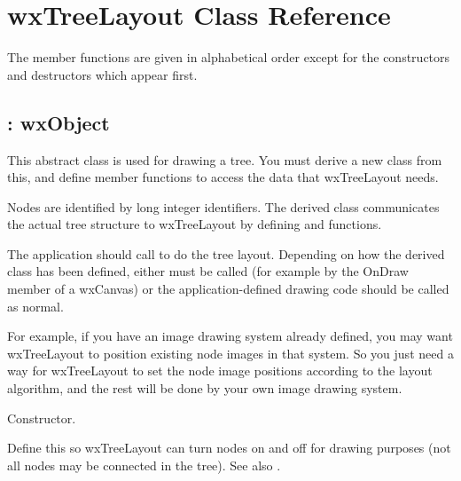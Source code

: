 \chapter{wxTreeLayout Class Reference}
%
\setfooter{\thepage}{}{}{}{}{\thepage}

The member functions are given in alphabetical order except for the
constructors and destructors which appear first.

\section{: wxObject}

This abstract class is used for drawing a tree. You must derive a new
class from this, and define member functions to access the data that
wxTreeLayout needs.

Nodes are identified by long integer identifiers. The derived class
communicates the actual tree structure to wxTreeLayout by defining \rtfsp
and  functions.

The application should call  to do the tree
layout. Depending on how the derived class has been defined, either
\rtfsp{} must be called (for example by the OnDraw member
of a wxCanvas) or the application-defined drawing code should be called
as normal.

For example, if you have an image drawing system already defined, you
may want wxTreeLayout to position existing node images in that system. So you
just need a way for wxTreeLayout to set the node image positions according to
the layout algorithm, and the rest will be done by your own image drawing
system.



Constructor.

\label{activatenode}


Define this so wxTreeLayout can turn nodes on and off for drawing purposes
(not all nodes may be connected in the tree). See also .

